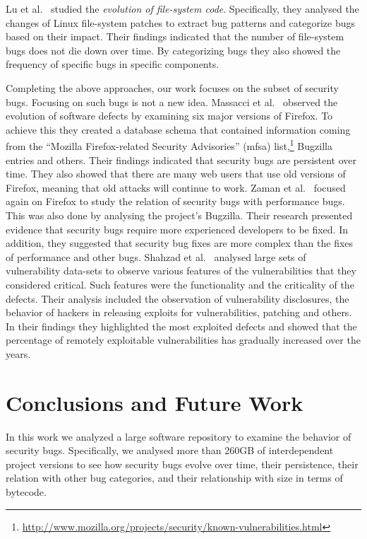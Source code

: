 \documentclass[conference]{llncs}
\begin{document}
Lu et al.~\cite{LAAL13} studied the {\it evolution of file-system code}.
Specifically, they analysed the changes of Linux file-system patches to extract
bug patterns and categorize bugs based on their impact. Their findings
indicated that the number of file-system bugs does not die down over time. By
categorizing bugs they also showed the frequency of specific bugs in specific
components.

Completing the above approaches, our work focuses on the subset of security bugs.
Focusing on such bugs is not a new idea. Massacci et al.~\cite{MNN11} observed
the evolution of software defects by examining six major versions of Firefox.
To achieve this they created a database schema that contained information
coming from the ``Mozilla Firefox-related Security Advisories'' ({\sc mfsa})
list,\footnote{\url{http://www.mozilla.org/projects/security/known-vulnerabilities.html}}
Bugzilla entries and others. Their findings indicated that security bugs are
persistent over time. They also showed that there are many web users that use
old versions of Firefox, meaning that old attacks will continue to work.
Zaman et al.~\cite{ZAH11} focused again on Firefox to study the relation of
security bugs with performance bugs. This was also done by analysing the project's
Bugzilla. Their research presented evidence that security bugs require more experienced developers
to be fixed. In addition, they suggested that security bug fixes are more complex than the
fixes of performance and other bugs.
Shahzad et al.~\cite{SSL12} analysed large sets of vulnerability data-sets to observe
various features of the vulnerabilities that they considered critical. Such features
were the functionality and the criticality of the defects. Their analysis
included the observation of vulnerability disclosures, the behavior of
hackers in releasing exploits for vulnerabilities, patching and others. In
their findings they highlighted the most exploited defects and showed that
the percentage of remotely exploitable vulnerabilities has gradually increased
over the years.

\section{Conclusions and Future Work}
\label{sec:con}

In this work we analyzed a large software repository to examine the
behavior of security bugs. Specifically, we analysed more than 260GB
of interdependent project versions to see how security bugs evolve
over time, their persistence, their relation with other bug
categories, and their relationship with size in terms of bytecode.
\end{document}

